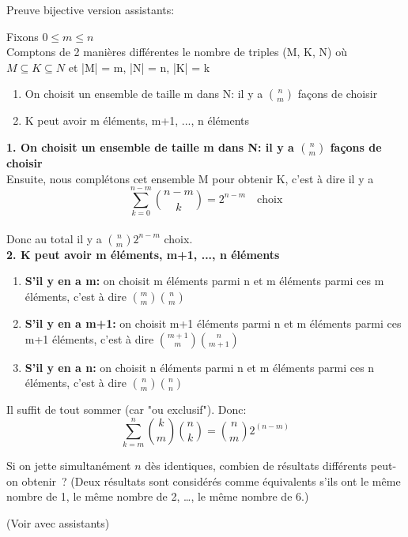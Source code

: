 Preuve bijective version assistants: \\

\begin{minipage}{0.4\textwidth}

\end{minipage}
\begin{minipage}{0.6\textwidth}
Fixons $0 \leq m \leq n$\\
Comptons de 2 manières différentes le nombre de triples (M, K, N) où $M \subseteq K \subseteq N$ et |M| = m, |N| = n, |K| = k\\

\begin{enumerate}
\item On choisit un ensemble de taille m dans N: il y a ${n \choose m}$ façons de choisir
\item K peut avoir m éléments, m+1, ..., n éléments \\
\end{enumerate}
\end{minipage}

\vspace{1cm}

\textbf{1. On choisit un ensemble de taille m dans N: il y a ${n \choose m}$ façons de choisir}\\

Ensuite, nous complétons cet ensemble M pour obtenir K, c'est à dire il y a $$\sum_{k=0}^{n-m} {n-m \choose k} = 2^{n-m} \quad \text{choix}$$ \\

Donc au total il y a ${n \choose m} 2^{n-m}$ choix.\\

\textbf{2. K peut avoir m éléments, m+1, ..., n éléments} \\

\begin{enumerate}
\item \textbf{S'il y en a m:} on choisit m éléments parmi n et m éléments parmi ces m éléments, c'est à dire ${m \choose m}{n \choose m}$
\item \textbf{S'il y en a m+1:} on choisit m+1 éléments parmi n et m éléments parmi ces m+1 éléments, c'est à dire ${m+1 \choose m}{n \choose m+1}$
\item \textbf{S'il y en a n:} on choisit n éléments parmi n et m éléments parmi ces n éléments, c'est à dire ${n \choose m}{n \choose n}$ \\
\end{enumerate}

Il suffit de tout sommer (car "ou exclusif"). Donc: $$ \sum_{k=m}^n {k \choose m}{n \choose k} = {n \choose m} 2^{(n-m)}$$

\vspace{1cm}


\begin{exo} 
Si on jette simultan\'ement $n$ d\`es identiques, combien de r\'esultats diff\'erents peut-on obtenir~? (Deux r\'esultats sont consid\'er\'es comme \'equivalents s'ils ont le m\^eme nombre de 1, le m\^eme nombre de 2, \ldots, le m\^eme nombre de 6.)
\end{exo}

(Voir avec assistants)